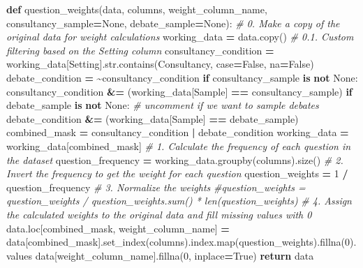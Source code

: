 \documentclass[
]{article}
\newenvironment{Shaded}{\begin{snugshade}}{\end{snugshade}}
\newcommand{\BuiltInTok}[1]{#1}
\newcommand{\CommentTok}[1]{\textcolor[rgb]{0.56,0.35,0.01}{\textit{#1}}}
\newcommand{\ControlFlowTok}[1]{\textcolor[rgb]{0.13,0.29,0.53}{\textbf{#1}}}
\newcommand{\DecValTok}[1]{\textcolor[rgb]{0.00,0.00,0.81}{#1}}
\newcommand{\KeywordTok}[1]{\textcolor[rgb]{0.13,0.29,0.53}{\textbf{#1}}}
\newcommand{\NormalTok}[1]{#1}
\newcommand{\OperatorTok}[1]{\textcolor[rgb]{0.81,0.36,0.00}{\textbf{#1}}}
\newcommand{\StringTok}[1]{\textcolor[rgb]{0.31,0.60,0.02}{#1}}
\newcommand{\VariableTok}[1]{\textcolor[rgb]{0.00,0.00,0.00}{#1}}
\begin{document}
\begin{Shaded}
\begin{Highlighting}[]
\KeywordTok{def}\NormalTok{ question\_weights(data, columns, weight\_column\_name, consultancy\_sample}\OperatorTok{=}\VariableTok{None}\NormalTok{, debate\_sample}\OperatorTok{=}\VariableTok{None}\NormalTok{):}
    \CommentTok{\# 0. Make a copy of the original data for weight calculations}
\NormalTok{    working\_data }\OperatorTok{=}\NormalTok{ data.copy()}
    \CommentTok{\# 0.1. Custom filtering based on the \textquotesingle{}Setting\textquotesingle{} column}
\NormalTok{    consultancy\_condition }\OperatorTok{=}\NormalTok{ working\_data[}\StringTok{\textquotesingle{}Setting\textquotesingle{}}\NormalTok{].}\BuiltInTok{str}\NormalTok{.contains(}\StringTok{\textquotesingle{}Consultancy\textquotesingle{}}\NormalTok{, case}\OperatorTok{=}\VariableTok{False}\NormalTok{, na}\OperatorTok{=}\VariableTok{False}\NormalTok{)}
\NormalTok{    debate\_condition }\OperatorTok{=} \OperatorTok{\textasciitilde{}}\NormalTok{consultancy\_condition}
    \ControlFlowTok{if}\NormalTok{ consultancy\_sample }\KeywordTok{is} \KeywordTok{not} \VariableTok{None}\NormalTok{:}
\NormalTok{        consultancy\_condition }\OperatorTok{\&=}\NormalTok{ (working\_data[}\StringTok{\textquotesingle{}Sample\textquotesingle{}}\NormalTok{] }\OperatorTok{==}\NormalTok{ consultancy\_sample)}
    \ControlFlowTok{if}\NormalTok{ debate\_sample }\KeywordTok{is} \KeywordTok{not} \VariableTok{None}\NormalTok{: }\CommentTok{\# uncomment if we want to sample debates}
\NormalTok{        debate\_condition }\OperatorTok{\&=}\NormalTok{ (working\_data[}\StringTok{\textquotesingle{}Sample\textquotesingle{}}\NormalTok{] }\OperatorTok{==}\NormalTok{ debate\_sample)}
\NormalTok{    combined\_mask }\OperatorTok{=}\NormalTok{ consultancy\_condition }\OperatorTok{|}\NormalTok{ debate\_condition}
\NormalTok{    working\_data }\OperatorTok{=}\NormalTok{ working\_data[combined\_mask]}
    \CommentTok{\# 1. Calculate the frequency of each question in the dataset}
\NormalTok{    question\_frequency }\OperatorTok{=}\NormalTok{ working\_data.groupby(columns).size()}
    \CommentTok{\# 2. Invert the frequency to get the weight for each question}
\NormalTok{    question\_weights }\OperatorTok{=} \DecValTok{1} \OperatorTok{/}\NormalTok{ question\_frequency}
    \CommentTok{\# 3. Normalize the weights}
    \CommentTok{\#question\_weights = question\_weights / question\_weights.sum() * len(question\_weights)}
    \CommentTok{\# 4. Assign the calculated weights to the original data and fill missing values with 0}
\NormalTok{    data.loc[combined\_mask, weight\_column\_name] }\OperatorTok{=}\NormalTok{ data[combined\_mask].set\_index(columns).index.}\BuiltInTok{map}\NormalTok{(question\_weights).fillna(}\DecValTok{0}\NormalTok{).values}
\NormalTok{    data[weight\_column\_name].fillna(}\DecValTok{0}\NormalTok{, inplace}\OperatorTok{=}\VariableTok{True}\NormalTok{)}
    \ControlFlowTok{return}\NormalTok{ data}


\end{Highlighting}
\end{Shaded}
\end{document}
